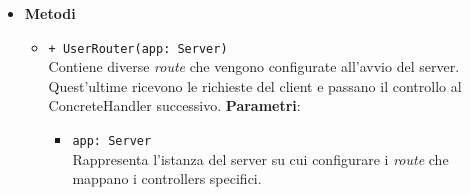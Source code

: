 \begin{itemize}
\begin{itemize}
	\end{itemize}
		\item \textbf{Metodi} 
		\begin{itemize}
		\item 
		\texttt{+ UserRouter(app: Server)} \\
		Contiene diverse \textit{route} che vengono configurate all’avvio del server. Quest’ultime ricevono le richieste del client e passano il controllo al ConcreteHandler successivo.
		\textbf{Parametri}:
			\begin{itemize}
				\item 
				\texttt{app: Server} \\
				Rappresenta l’istanza del server su cui configurare i \textit{route} che mappano i controllers specifici.
			\end{itemize}
		\end{itemize}
\end{itemize}		